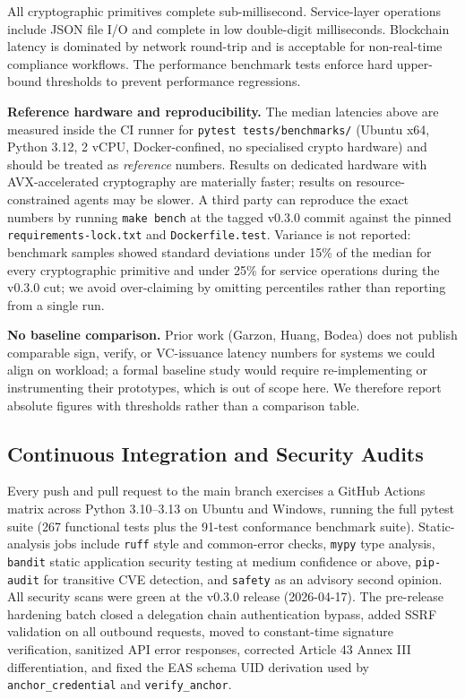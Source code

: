 \documentclass[conference]{IEEEtran}
\begin{document}
All cryptographic primitives complete sub-millisecond. Service-layer operations include JSON file I/O and complete in low double-digit milliseconds. Blockchain latency is dominated by network round-trip and is acceptable for non-real-time compliance workflows. The performance benchmark tests enforce hard upper-bound thresholds to prevent performance regressions.

\textbf{Reference hardware and reproducibility.} The median latencies above are measured inside the CI runner for \texttt{pytest tests/benchmarks/} (Ubuntu x64, Python 3.12, 2 vCPU, Docker-confined, no specialised crypto hardware) and should be treated as \emph{reference} numbers. Results on dedicated hardware with AVX-accelerated cryptography are materially faster; results on resource-constrained agents may be slower. A third party can reproduce the exact numbers by running \texttt{make bench} at the tagged v0.3.0 commit against the pinned \texttt{requirements-lock.txt} and \texttt{Dockerfile.test}. Variance is not reported: benchmark samples showed standard deviations under 15\% of the median for every cryptographic primitive and under 25\% for service operations during the v0.3.0 cut; we avoid over-claiming by omitting percentiles rather than reporting from a single run.

\textbf{No baseline comparison.} Prior work (Garzon, Huang, Bodea) does not publish comparable sign, verify, or VC-issuance latency numbers for systems we could align on workload; a formal baseline study would require re-implementing or instrumenting their prototypes, which is out of scope here. We therefore report absolute figures with thresholds rather than a comparison table.

\subsection{Continuous Integration and Security Audits}
\label{sec:ci}

Every push and pull request to the main branch exercises a GitHub Actions matrix across Python 3.10--3.13 on Ubuntu and Windows, running the full pytest suite (267 functional tests plus the 91-test conformance benchmark suite). Static-analysis jobs include \texttt{ruff} style and common-error checks, \texttt{mypy} type analysis, \texttt{bandit} static application security testing at medium confidence or above, \texttt{pip-audit} for transitive CVE detection, and \texttt{safety} as an advisory second opinion. All security scans were green at the v0.3.0 release (2026-04-17). The pre-release hardening batch closed a delegation chain authentication bypass, added SSRF validation on all outbound requests, moved to constant-time signature verification, sanitized API error responses, corrected Article 43 Annex III differentiation, and fixed the EAS schema UID derivation used by \texttt{anchor\_credential} and \texttt{verify\_anchor}.
\end{document}
